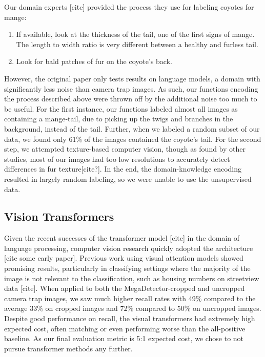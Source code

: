 \documentclass{article}
\begin{document}
Our domain experts [cite] provided the process they use for labeling coyotes for mange:
\begin{enumerate}
    \item If available, look at the thickness of the tail, one of the first signs of mange. The length to width ratio is very different between a healthy and furless tail.
    \item Look for bald patches of fur on the coyote’s back.
\end{enumerate}

However, the original paper only tests results on language models, a domain with significantly less noise than camera trap images. As such, our functions encoding the process described above were thrown off by the additional noise too much to be useful. For the first instance, our functions labeled almost all images as containing a mange-tail, due to picking up the twigs and branches in the background, instead of the tail. Further, when we labeled a random subset of our data, we found only 61\% of the images contained the coyote’s tail. For the second step, we attempted texture-based computer vision, though as found by other studies, most of our images had too low resolutions to accurately detect differences in fur texture[cite?]. In the end, the domain-knowledge encoding resulted in largely random labeling, so we were unable to use the unsupervised data.

\subsection{Vision Transformers}
Given the recent successes of the transformer model [cite] in the domain of language processing, computer vision research quickly adopted the architecture [cite some early paper].  Previous work using visual attention models showed promising results, particularly in classifying settings where the majority of the image is not relevant to the classification, such as housing numbers on streetview data [cite]. When applied to both the MegaDetector-cropped and uncropped camera trap images, we saw much higher recall rates with 49\% compared to the average 33\% on cropped images and 72\% compared to 50\% on uncropped images. Despite good performance on recall, the visual transformers had extremely high expected cost, often matching or even performing worse than the all-positive baseline. As our final evaluation metric is 5:1 expected cost, we chose to not pursue transformer methods any further.
\end{document}
